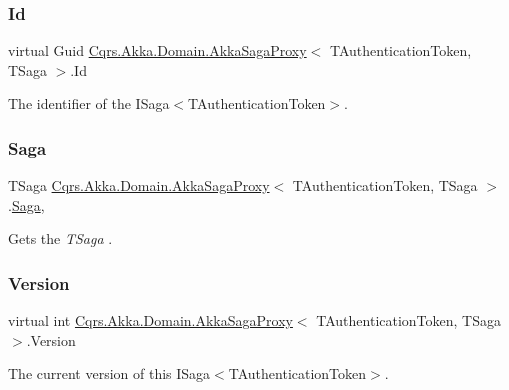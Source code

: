 \subsubsection{\texorpdfstring{Id}{Id}}
{\footnotesize\ttfamily virtual Guid \hyperlink{classCqrs_1_1Akka_1_1Domain_1_1AkkaSagaProxy}{Cqrs.\+Akka.\+Domain.\+Akka\+Saga\+Proxy}$<$ T\+Authentication\+Token, T\+Saga $>$.Id\hspace{0.3cm}{\ttfamily [get]}}



The identifier of the I\+Saga$<$\+T\+Authentication\+Token$>$. 

\mbox{\label{classCqrs_1_1Akka_1_1Domain_1_1AkkaSagaProxy_ac63a109e223eb4f046ebe9ad22b9a850_ac63a109e223eb4f046ebe9ad22b9a850}} 
\subsubsection{\texorpdfstring{Saga}{Saga}}
{\footnotesize\ttfamily T\+Saga \hyperlink{classCqrs_1_1Akka_1_1Domain_1_1AkkaSagaProxy}{Cqrs.\+Akka.\+Domain.\+Akka\+Saga\+Proxy}$<$ T\+Authentication\+Token, T\+Saga $>$.\hyperlink{classCqrs_1_1Domain_1_1Saga}{Saga}\hspace{0.3cm}{\ttfamily [get]}, {}}



Gets the {\itshape T\+Saga} . 

\mbox{\label{classCqrs_1_1Akka_1_1Domain_1_1AkkaSagaProxy_ab6272400fe5c6227a11cf5c93f752d4d_ab6272400fe5c6227a11cf5c93f752d4d}} 
\subsubsection{\texorpdfstring{Version}{Version}}
{\footnotesize\ttfamily virtual int \hyperlink{classCqrs_1_1Akka_1_1Domain_1_1AkkaSagaProxy}{Cqrs.\+Akka.\+Domain.\+Akka\+Saga\+Proxy}$<$ T\+Authentication\+Token, T\+Saga $>$.Version\hspace{0.3cm}{\ttfamily [get]}}



The current version of this I\+Saga$<$\+T\+Authentication\+Token$>$. 


